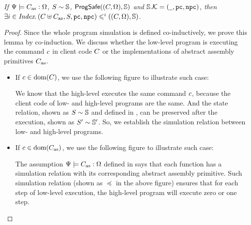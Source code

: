 {\begin{lemma}
    \label{lemma:function sim implies whole program sim}
    \em
    If ${\Psi} \models {C_{\text{as}}} : {\Omega}$,
    ${S} \sim {\mathbb{S}}$,
    $\textsf{ProgSafe}((C, \Omega), \mathbb{S})$ and
    $\mathbb{S}.\mathcal{K} = (\underline{\ \,}, \texttt{pc}, \texttt{npc})$,
    then
    $\exists i \in \textit{Index}. \,
    (C\uplus C_{\text{as}}, S, \texttt{pc}, \texttt{npc})
    \leqslant^{i} ((C, \Omega), \mathbb{S})$.
\end{lemma}
\begin{proof}
    Since the whole program simulation is defined
    co-inductively, we prove this lemma by co-induction.
    We discuss whether the low-level program
    is executing the command $c$ in client code
    $C$ or the implementations of
    abstract assembly primitives $C_{\text{as}}$.
    \begin{itemize}
        \item If $c \in \text{dom}(C)$, we use the
            following figure to illustrate such case:
            \begin{center}
                \vspace*{-0.5em}
                
                \vspace*{-0.5em}
            \end{center}
            We know that the high-level executes the same command
            $c$, because the client code of low- and
            high-level programs are the same.
            And the state relation, shown as ${S} \sim {\mathbb{S}}$
            and defined in \Sec{\ref{subsec:correctness-primitive}},
            can be preserved after the execution, shown
            as ${S'} \sim {\mathbb{S}'}$. So, we
            establish the simulation relation between
            low- and high-level programs.

        \item If $c \in \text{dom}(C_{\text{as}})$, we use the
            following figure to illustrate such case:
            \begin{center}
                \vspace*{-0.5em}
                
                \vspace*{-0.5em}
            \end{center}
            The assumption ${\Psi} \models {C_{\text{as}}} : {\Omega}$
            defined in \Def{\ref{def:wdprim-sem}} says that
            each \sparc{} function has a simulation relation
            with its corresponding abstract assembly primitive.
            Such simulation relation
            (shown as $\preccurlyeq$ in the above figure)
            ensures that for each step
            of low-level execution, the high-level program will
            execute zero or one step.
    \end{itemize}


\end{proof}}

